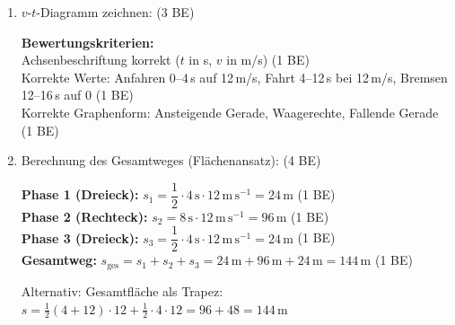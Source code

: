 \documentclass[11pt,a4paper]{article}
\newcommand{\lsg}[1]{\textcolor{correct}{#1}}
\newcommand{\be}[1]{\hfill\textcolor{correct}{\small(#1 BE)}}
\begin{document}
\begin{enumerate}
\item[a)] $v$-$t$-Diagramm zeichnen: \be{3}

\begin{center}
\end{center}

\textbf{Bewertungskriterien:}\\
\lsg{Achsenbeschriftung korrekt ($t$ in s, $v$ in m/s)} \hfill(1 BE)\\
\lsg{Korrekte Werte: Anfahren 0--4\,s auf 12\,m/s, Fahrt 4--12\,s bei 12\,m/s, Bremsen 12--16\,s auf 0} \hfill(1 BE)\\
\lsg{Korrekte Graphenform: Ansteigende Gerade, Waagerechte, Fallende Gerade} \hfill(1 BE)

\item[b)] Berechnung des Gesamtweges (Flächenansatz): \be{4}

\lsg{\textbf{Phase 1 (Dreieck):} $s_1 = \dfrac{1}{2} \cdot 4\,\mathrm{s} \cdot 12\,\mathrm{m\,s^{-1}} = 24\,\mathrm{m}$} \hfill(1 BE)\\[0.2cm]
\lsg{\textbf{Phase 2 (Rechteck):} $s_2 = 8\,\mathrm{s} \cdot 12\,\mathrm{m\,s^{-1}} = 96\,\mathrm{m}$} \hfill(1 BE)\\[0.2cm]
\lsg{\textbf{Phase 3 (Dreieck):} $s_3 = \dfrac{1}{2} \cdot 4\,\mathrm{s} \cdot 12\,\mathrm{m\,s^{-1}} = 24\,\mathrm{m}$} \hfill(1 BE)\\[0.2cm]
\lsg{\textbf{Gesamtweg:} $s_{\text{ges}} = s_1 + s_2 + s_3 = 24\,\mathrm{m} + 96\,\mathrm{m} + 24\,\mathrm{m} = 144\,\mathrm{m}$} \hfill(1 BE)

{\small\color{correct} Alternativ: Gesamtfläche als Trapez: $s = \frac{1}{2}(4 + 12) \cdot 12 + \frac{1}{2} \cdot 4 \cdot 12 = 96 + 48 = 144\,\mathrm{m}$}


\end{enumerate}
\end{document}
